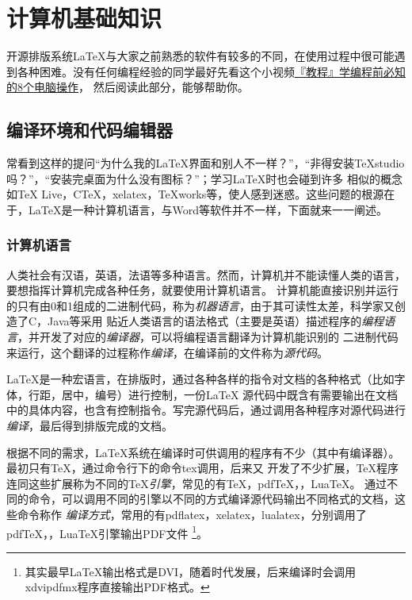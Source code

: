 \section{计算机基础知识}


开源排版系统\LaTeX{}与大家之前熟悉的软件有较多的不同，在使用过程中很可能遇到各种困难。没有任何编程经验的同学最好先看这个小视频\href{https://www.bilibili.com/video/BV1t4411v78E?from=search&seid=5662014810176309518&spm_id_from=333.337.0.0}{『教程』学编程前必知的8个电脑操作}，
然后阅读此部分，能够帮助你。


\subsection{编译环境和代码编辑器}
常看到这样的提问“为什么我的\LaTeX{}界面和别人不一样？”，“非得安装TeXstudio吗？”，“安装完桌面为什么没有图标？”；学习LaTeX时也会碰到许多
相似的概念如\TeX{} Live，C\TeX{}，xelatex，TeXworks等，使人感到迷惑。这些问题的根源在于，\LaTeX{}是一种计算机语言，与Word等软件并不一样，下面就来一一阐述。



\subsubsection{计算机语言}

人类社会有汉语，英语，法语等多种语言。然而，计算机并不能读懂人类的语言，要想指挥计算机完成各种任务，就要使用计算机语言。
计算机能直接识别并运行的只有由0和1组成的二进制代码，称为\emph{机器语言}，由于其可读性太差，科学家又创造了C，Java等采用
贴近人类语言的语法格式（主要是英语）描述程序的\emph{编程语言}，并开发了对应的\emph{编译器}，可以将编程语言翻译为计算机能识别的
二进制代码来运行，这个翻译的过程称作\emph{编译}，在编译前的文件称为\emph{源代码}。

\LaTeX{}是一种宏语言，在排版时，通过各种各样的指令对文档的各种格式（比如字体，行距，居中，编号）进行控制，一份\LaTeX{}
源代码中既含有需要输出在文档中的具体内容，也含有控制指令。写完源代码后，通过调用各种程序对源代码进行\emph{编译}，最后得到排版完成的文档。

根据不同的需求，\LaTeX{}系统在编译时可供调用的程序有不少（其中有编译器）。最初只有\TeX{}，通过命令行下的命令tex调用，后来又
开发了不少扩展，\TeX{}程序连同这些扩展称为不同的\TeX{}\emph{引擎}，常见的有\TeX{}，pdf\TeX{}，\XeTeX{}，Lua\TeX{}。
通过不同的命令，可以调用不同的引擎以不同的方式编译源代码输出不同格式的文档，这些命令称作
\emph{编译方式}，常用的有pdflatex，xelatex，lualatex，分别调用了pdf\TeX{}，\XeTeX{}，Lua\TeX{}引擎输出PDF文件
\footnote{其实最早\LaTeX{}输出格式是DVI，随着时代发展，后来编译时会调用xdvipdfmx程序直接输出PDF格式。}。


